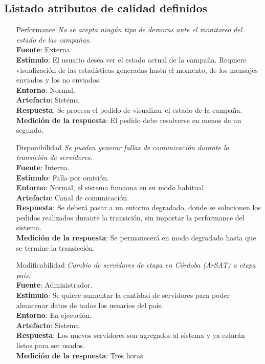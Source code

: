 \documentclass[a4paper, 11pt]{article}
\begin{document}
\subsection{Listado atributos de calidad definidos}
\begin{itemize}

\item[Performance] \textit{No se acepta ningún tipo de demoras ante el monitoreo del estado de las campañas.}\\
\textbf{Fuente}: Externa. \\
\textbf{Estímulo}: El usuario desea ver el estado actual de la campaña. Requiere visualización de las estadísticas generadas hasta el momento, de los mensajes enviados y los no enviados. \\
\textbf{Entorno}: Normal.\\
\textbf{Artefacto}: Sistema.\\
\textbf{Respuesta}: Se procesa el pedido de visualizar el estado de la campaña.\\
\textbf{Medición de la respuesta}: El pedido debe resolverse en menos de un segundo. \\

\item[Disponibilidad] \textit{Se pueden generar fallas de comunicación durante la transición de servidores.}\\
\textbf{Fuente}: Interna.\\
\textbf{Estímulo}: Falla por omisión.\\
\textbf{Entorno}: Normal, el sistema funciona en su modo habitual.\\
\textbf{Artefacto}: Canal de comunicación.\\
\textbf{Respuesta}: Se deberá pasar a un entorno degradado, donde se solucionen los pedidos realizados durante la transición, sin importar la performance del sistema.\\
\textbf{Medición de la respuesta}:  Se permanecerá en modo degradado hasta que se termine la transicción.\\

\item[Modificabilidad] \textit{Cambio de servidores de etapa en Córdoba (ArSAT) a etapa país.}\\
\textbf{Fuente}: Administrador. \\
\textbf{Estímulo}: Se quiere aumentar la cantidad de servidores para poder almacenar datos de todos los usuarios del país. \\
\textbf{Entorno}: En ejecución. \\
\textbf{Artefacto}: Sistema. \\
\textbf{Respuesta}: Los nuevos servidores son agregados al sistema y ya estarán listos para ser usados. \\
\textbf{Medición de la respuesta}:  Tres horas.\\


\end{itemize}
\end{document}
